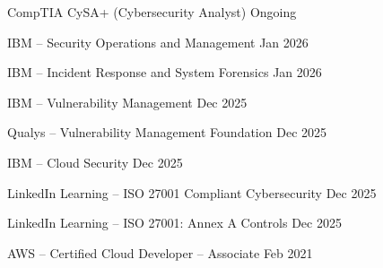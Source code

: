 


\begin{cvhonors}

  \cvhonor
    {CompTIA CySA+ (Cybersecurity Analyst)}
    {Ongoing}

  \cvhonor
    {IBM -- Security Operations and Management} %
    {Jan 2026} %

  \cvhonor
    {IBM -- Incident Response and System Forensics}
    {Jan 2026}

  \cvhonor
    {IBM -- Vulnerability Management}
    {Dec 2025}

  \cvhonor
    {Qualys -- Vulnerability Management Foundation}
    {Dec 2025}

  \cvhonor
    {IBM -- Cloud Security}
    {Dec 2025}

  \cvhonor
    {LinkedIn Learning -- ISO 27001 Compliant Cybersecurity}
    {Dec 2025}

  \cvhonor
    {LinkedIn Learning -- ISO 27001: Annex A Controls}
    {Dec 2025}

  \cvhonor
    {AWS -- Certified Cloud Developer – Associate}
    {Feb 2021}

\end{cvhonors}